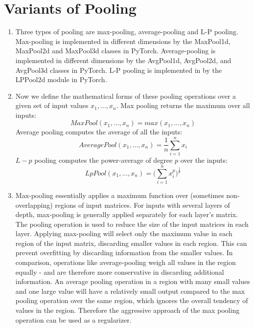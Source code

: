 \documentclass[a4paper]{article}
\begin{document}
\section{Variants of Pooling}
\begin{enumerate}
\item{Three types of pooling are max-pooling, average-pooling and L-P pooling. Max-pooling is implemented in different dimensions by the MaxPool1d, MaxPool2d and MaxPool3d classes in PyTorch. Average-pooling is implemented in different dimensions by the AvgPool1d, AvgPool2d, and AvgPool3d classes in PyTorch. L-P pooling is implemented in by the LPPool2d module in PyTorch. }
\item{  Now we define the mathematical forms of these pooling operations over a given set of input values $x_1,...,x_n$. 
Max pooling returns the maximum over all inputs:
$$MaxPool(x_1,...,x_n) = max( x_1, ...,x_n) $$
Average pooling computes the average of all the inputs:
$$AveragePool(x_1,...,x_n) = \frac{1}{n} \sum_{i=1}^n x_i$$
$L-p$ pooling computes the power-average of degree $p$ over the inputs:
$$LpPool(x_1,...,x_n) = \Bigg( \sum_{i=1}^n x_i^p \Bigg)^{\frac{1}{p}}$$

}
\item{ Max-pooling essentially applies a maximum function over (sometimes non-overlapping) regions of input matrices. For inputs with several layers of depth, max-pooling is generally applied separately for each layer's matrix. The pooling operation is used to reduce the size of the input matrices in each layer. Applying max-pooling will select only the maximum value in each region of the input matrix, discarding smaller values in each region. This can prevent overfitting by discarding information from the smaller values. In comparison, operations like average-pooling weigh all values in the region equally - and are therefore more conservative in discarding additional information. An average pooling operation in a region with many small values and one large value will have a relatively small output compared to the max pooling operation over the same region, which ignores the overall tendency of values in the region. Therefore the aggressive approach of the max pooling operation can be used as a regularizer. 
}
\end{enumerate}
\end{document}
